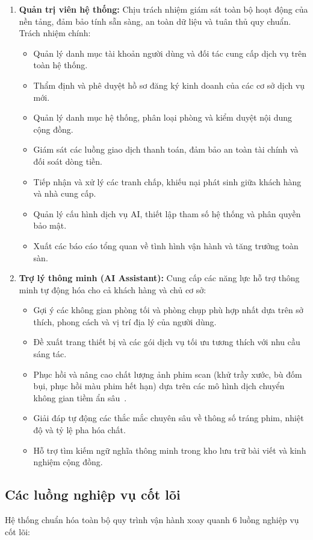 \begin{enumerate}[leftmargin=2em]
    \item \textbf{Quản trị viên hệ thống:}
    Chịu trách nhiệm giám sát toàn bộ hoạt động của nền tảng, đảm bảo tính sẵn sàng, an toàn dữ liệu và tuân thủ quy chuẩn. Trách nhiệm chính:
    \begin{itemize}
        \item Quản lý danh mục tài khoản người dùng và đối tác cung cấp dịch vụ trên toàn hệ thống.
        \item Thẩm định và phê duyệt hồ sơ đăng ký kinh doanh của các cơ sở dịch vụ mới.
        \item Quản lý danh mục hệ thống, phân loại phòng và kiểm duyệt nội dung cộng đồng.
        \item Giám sát các luồng giao dịch thanh toán, đảm bảo an toàn tài chính và đối soát dòng tiền.
        \item Tiếp nhận và xử lý các tranh chấp, khiếu nại phát sinh giữa khách hàng và nhà cung cấp.
        \item Quản lý cấu hình dịch vụ AI, thiết lập tham số hệ thống và phân quyền bảo mật.
        \item Xuất các báo cáo tổng quan về tình hình vận hành và tăng trưởng toàn sàn.
    \end{itemize}

    \item \textbf{Trợ lý thông minh (AI Assistant):}
    Cung cấp các năng lực hỗ trợ thông minh tự động hóa cho cả khách hàng và chủ cơ sở:
    \begin{itemize}
        \item Gợi ý các không gian phòng tối và phòng chụp phù hợp nhất dựa trên sở thích, phong cách và vị trí địa lý của người dùng.
        \item Đề xuất trang thiết bị và các gói dịch vụ tối ưu tương thích với nhu cầu sáng tác.
        \item Phục hồi và nâng cao chất lượng ảnh phim scan (khử trầy xước, bù đốm bụi, phục hồi màu phim hết hạn) dựa trên các mô hình dịch chuyển không gian tiềm ẩn sâu~\cite{wan2023old, rombach2022high}.
        \item Giải đáp tự động các thắc mắc chuyên sâu về thông số tráng phim, nhiệt độ và tỷ lệ pha hóa chất.
        \item Hỗ trợ tìm kiếm ngữ nghĩa thông minh trong kho lưu trữ bài viết và kinh nghiệm cộng đồng.
    \end{itemize}
\end{enumerate}

\subsection{Các luồng nghiệp vụ cốt lõi}
Hệ thống chuẩn hóa toàn bộ quy trình vận hành xoay quanh 6 luồng nghiệp vụ cốt lõi:

